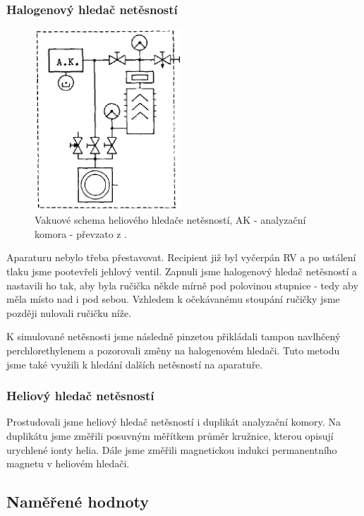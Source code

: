 \documentclass[english]{article}
\begin{document}
		\subsubsection{Halogenový hledač netěsností}
			\begin{figure}
						\centering
						\includegraphics[width=5.5cm]{../att/schema_he}
						\caption{Vakuové schema heliového hledače netěsností, AK - analyzační komora - převzato z \cite{bib:praskripta}.}
						\label{fig:s_3}
						\vspace{-0.3cm}
			\end{figure}
			
			Aparaturu nebylo třeba přestavovat. Recipient již byl vyčerpán RV a po ustálení tlaku jsme pootevřeli jehlový ventil. Zapnuli jsme halogenový hledač netěsností a nastavili ho tak, aby byla ručička někde mírně pod polovinou stupnice - tedy aby měla místo nad i pod sebou. Vzhledem k očekávanému stoupání ručičky jsme později nulovali ručičku níže. 
			
			K simulované netěsnosti jsme následně pinzetou přikládali tampon navlhčený perchlorethylenem a pozorovali změny na halogenovém hledači. Tuto metodu jsme také využili k hledání dalších netěsností na aparatuře.
	
		\subsubsection{Heliový hledač netěsností}
					
			Prostudovali jsme heliový hledač netěsností i duplikát analyzační komory. Na duplikátu jsme změřili posuvným měřítkem průměr kružnice, kterou opisují urychlené ionty helia. Dále jsme změřili magnetickou indukci permanentního magnetu v heliovém hledači. 
			
	\subsection{Naměřené hodnoty}
\end{document}
